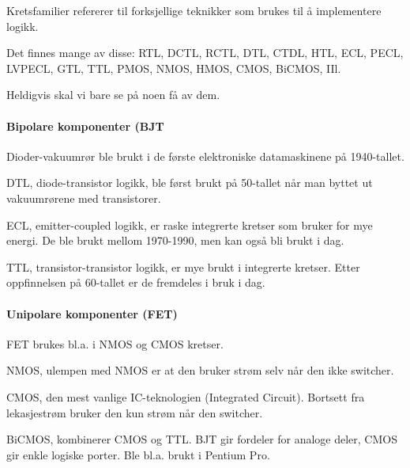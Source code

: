 Kretsfamilier refererer til forksjellige teknikker som brukes til å
implementere logikk.

Det finnes mange av disse: RTL, DCTL, RCTL, DTL, CTDL, HTL, ECL, PECL, LVPECL,
GTL, TTL, PMOS, NMOS, HMOS, CMOS, BiCMOS, IIl.

Heldigvis skal vi bare se på noen få av dem.



\paragraph{Bipolare komponenter (BJT} \mbox \\
Dioder-vakuumrør ble brukt i de første elektroniske datamaskinene
på 1940-tallet.

DTL, diode-transistor logikk, ble først brukt på 50-tallet når man byttet ut
vakuumrørene med transistorer.

ECL, emitter-coupled logikk, er raske integrerte kretser som bruker for mye
energi. De ble brukt mellom 1970-1990, men kan også bli brukt i dag.

TTL, transistor-transistor logikk, er mye brukt i integrerte kretser.
Etter oppfinnelsen på 60-tallet er de fremdeles i bruk i dag.



\paragraph{Unipolare komponenter (FET)} \mbox \\
FET brukes bl.a. i NMOS og CMOS kretser.

NMOS, ulempen med NMOS er at den bruker strøm selv når den ikke switcher.

CMOS, den mest vanlige IC-teknologien (Integrated Circuit).
Bortsett fra lekasjestrøm bruker den kun strøm når den switcher.

BiCMOS, kombinerer CMOS og TTL.
BJT gir fordeler for analoge deler, CMOS gir enkle logiske porter.
Ble bl.a. brukt i Pentium Pro.
